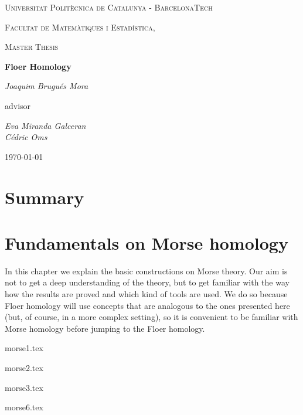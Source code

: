 \documentclass[a4paper,11pt]{book}
\theoremstyle{indented}
\begin{document}
\begin{titlepage}
	\centering
	{\scshape\LARGE Universitat Politècnica de Catalunya - BarcelonaTech\par}
	{\scshape\LARGE Facultat de Matemàtiques i Estadística, \par}
	\vspace{1cm}
	{\scshape\Large Master Thesis\par}
	\vspace{1.5cm}
	{\huge\bfseries Floer Homology\par}
	\vspace{2cm}
	{\Large\itshape Joaquim Brugués Mora\par}
	\vfill
	advisor\par
	{\Large\itshape Eva Miranda Galceran \\ Cédric Oms \par}

	\vfill

	{\large \today\par}
\end{titlepage}


\chapter*{Summary}


\tableofcontents

\mainmatter

\chapter{Fundamentals on Morse homology}
In this chapter we explain the basic constructions on Morse theory. Our aim is not to get a deep understanding of the theory, but to get familiar with the way how the results are proved and which kind of tools are used. We do so because Floer homology will use concepts that are analogous to the ones presented here (but, of course, in a more complex setting), so it is convenient to be familiar with Morse homology before jumping to the Floer homology.

{morse1.tex}

 {morse2.tex}

 {morse3.tex}



 {morse6.tex}

\end{document}

